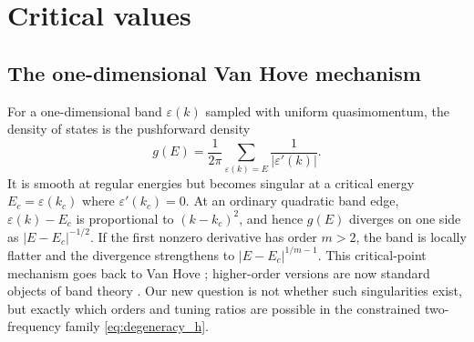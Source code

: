 \documentclass[11pt]{amsart}
\numberwithin{equation}{section}\setcounter{tocdepth}{3}\setcounter{secnumdepth}{3}
\begin{document}
\section{Critical values}\label{sec:critical}
\subsection{The one-dimensional Van Hove mechanism}\label{subsec:van_hove_summary}
For a one-dimensional band $\varepsilon(k)$ sampled with uniform quasimomentum, the
density of states is the pushforward density
\begin{equation}
 g(E)=\frac{1}{2\pi}\sum_{\varepsilon(k)=E}\frac{1}{|\varepsilon'(k)|}.
 \label{eq:van_hove_dos}
\end{equation}
It is smooth at regular energies but becomes singular at a critical energy
$E_c=\varepsilon(k_c)$ where $\varepsilon'(k_c)=0$.  At an ordinary quadratic band
edge, $\varepsilon(k)-E_c$ is proportional to $(k-k_c)^2$, and hence
$g(E)$ diverges on one side as $|E-E_c|^{-1/2}$.  If the first nonzero derivative has
order $m>2$, the band is locally flatter and the divergence strengthens to
$|E-E_c|^{1/m-1}$.  This critical-point mechanism goes back to Van Hove
\cite{VanHove1953}; higher-order versions are now standard objects of band theory
\cite{ClassenBetouras2025}.  Our new question is not whether such singularities exist,
but exactly which orders and tuning ratios are possible in the constrained
two-frequency family \eqref{eq:degeneracy_h}.
\end{document}

